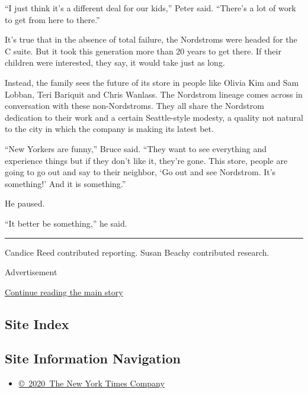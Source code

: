 ``I just think it's a different deal for our kids,'' Peter said.
``There's a lot of work to get from here to there.''

It's true that in the absence of total failure, the Nordstroms were
headed for the C suite. But it took this generation more than 20 years
to get there. If their children were interested, they say, it would take
just as long.

Instead, the family sees the future of its store in people like Olivia
Kim and Sam Lobban, Teri Bariquit and Chris Wanlass. The Nordstrom
lineage comes across in conversation with these non-Nordstroms. They all
share the Nordstrom dedication to their work and a certain Seattle-style
modesty, a quality not natural to the city in which the company is
making its latest bet.

``New Yorkers are funny,'' Bruce said. ``They want to see everything and
experience things but if they don't like it, they're gone. This store,
people are going to go out and say to their neighbor, `Go out and see
Nordstrom. It's something!' And it is something.''

He paused.

``It better be something,'' he said.

\begin{center}\rule{0.5\linewidth}{\linethickness}\end{center}

Candice Reed contributed reporting. Susan Beachy contributed research.

Advertisement

\protect\hyperlink{after-bottom}{Continue reading the main story}

\hypertarget{site-index}{%
\subsection{Site Index}\label{site-index}}

\hypertarget{site-information-navigation}{%
\subsection{Site Information
Navigation}\label{site-information-navigation}}

\begin{itemize}
\tightlist
\item
  \href{https://help.nytimes3xbfgragh.onion/hc/en-us/articles/115014792127-Copyright-notice}{©~2020~The
  New York Times Company}
\end{itemize}


